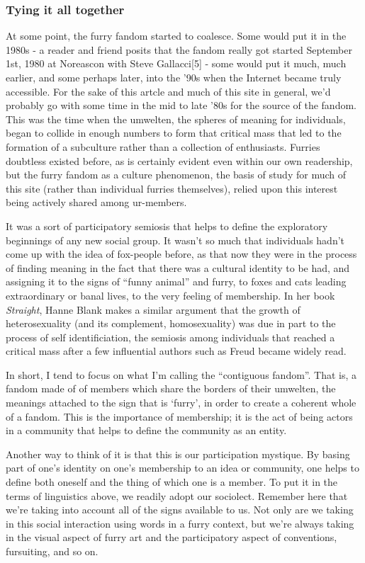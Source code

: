 \subsubsection{Tying it all together}\label{tying-it-all-together}

At some point, the furry fandom started to coalesce. Some would put it
in the 1980s - a reader and friend posits that the fandom really got
started September 1st, 1980 at Noreascon with Steve Gallacci{[}5{]} -
some would put it much, much earlier, and some perhaps later, into the
'90s when the Internet became truly accessible. For the sake of this
artcle and much of this site in general, we'd probably go with some time
in the mid to late '80s for the source of the fandom. This was the time
when the umwelten, the spheres of meaning for individuals, began to
collide in enough numbers to form that critical mass that led to the
formation of a subculture rather than a collection of enthusiasts.
Furries doubtless existed before, as is certainly evident even within
our own readership, but the furry fandom as a culture phenomenon, the
basis of study for much of this site (rather than individual furries
themselves), relied upon this interest being actively shared among
ur-members.

It was a sort of participatory semiosis that helps to define the
exploratory beginnings of any new social group. It wasn't so much that
individuals hadn't come up with the idea of fox-people before, as that
now they were in the process of finding meaning in the fact that there
was a cultural identity to be had, and assigning it to the signs of
``funny animal'' and furry, to foxes and cats leading extraordinary or
banal lives, to the very feeling of membership. In her book
\emph{Straight}, Hanne Blank makes a similar argument that the growth of
heterosexuality (and its complement, homosexuality) was due in part to
the process of self identificiation, the semiosis among individuals that
reached a critical mass after a few influential authors such as Freud
became widely read.

In short, I tend to focus on what I'm calling the ``contiguous fandom''.
That is, a fandom made of of members which share the borders of their
umwelten, the meanings attached to the sign that is `furry', in order to
create a coherent whole of a fandom. This is the importance of
membership; it is the act of being actors in a community that helps to
define the community as an entity.

Another way to think of it is that this is our participation mystique.
By basing part of one's identity on one's membership to an idea or
community, one helps to define both oneself and the thing of which one
is a member. To put it in the terms of linguistics above, we readily
adopt our sociolect. Remember here that we're taking into account all of
the signs available to us. Not only are we taking in this social
interaction using words in a furry context, but we're always taking in
the visual aspect of furry art and the participatory aspect of
conventions, fursuiting, and so on.

